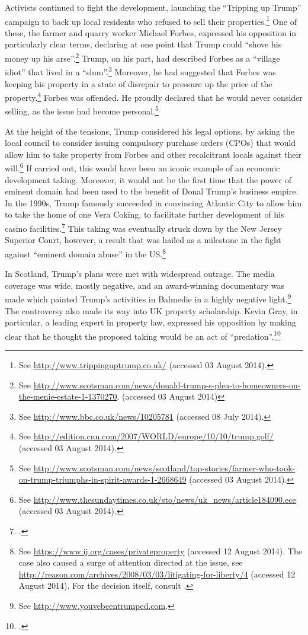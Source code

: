 Activists continued to fight the development, launching the ``Tripping up Trump'' campaign to back up local residents who refused to sell their properties.\footnote{See \url{http://www.trippinguptrump.co.uk/} (accessed 03 August 2014).} One of these, the farmer and quarry worker Michael Forbes, expressed his opposition in particularly clear terms, declaring at one point that Trump could ``shove his money up his arse''.\footnote{See \url{http://www.scotsman.com/news/donald-trump-s-plea-to-homeowners-on-the-menie-estate-1-1370270}. (accessed 03 August 2014)} Trump, on his part, had described Forbes as a ``village idiot'' that lived in a ``slum''.\footnote{See \url{http://www.bbc.co.uk/news/10205781} (accessed 08 July 2014).} Moreover, he had suggested that Forbes was keeping his property in a state of disrepair to pressure up the price of the property.\footnote{See \url{http://edition.cnn.com/2007/WORLD/europe/10/10/trump.golf/} (accessed 03 August 2014).} Forbes was offended. He proudly declared that he would never consider selling, as the issue had become personal.\footnote{See \url{http://www.scotsman.com/news/scotland/top-stories/farmer-who-took-on-trump-triumphs-in-spirit-awards-1-2668649} (accessed 03 August 2014).}

At the height of the tensions, Trump considered his legal options, by asking the local council to consider issuing compulsory purchase orders (CPOs) that would allow him to take property from Forbes and other recalcitrant locals against their will.\footnote{See \url{http://www.thesundaytimes.co.uk/sto/news/uk_news/article184090.ece} (accessed 03 August 2014).} If carried out, this would have been an iconic example of an economic development taking. Moreover, it would not be the first time that the power of eminent domain had been used to the benefit of Donal Trump's business empire. In the 1990s, Trump famously succeeded in convincing Atlantic City to allow him to take the home of one Vera Coking, to facilitate further development of his casino facilities.\footcite[297-301]{jones00} This taking was eventually struck down by the New Jersey Superior Court, however, a result that was hailed as a milestone in the fight against ``eminent domain abuse'' in the US.\footnote{See \url{https://www.ij.org/cases/privateproperty} (accessed 12 August 2014). The case also caused a surge of attention directed at the issue, see \url{http://reason.com/archives/2008/03/03/litigating-for-liberty/4} (accessed 12 August 2014). For the decision itself, consult \cite{banin98}.}

In Scotland, Trump's plans were met with widespread outrage. The media coverage was wide, mostly negative, and an award-winning documentary was made which painted Trump's activities in Balmedie in a highly negative light.\footnote{See \url{http://www.youvebeentrumped.com}.} The controversy also made its way into UK property scholarship. Kevin Gray, in particular, a leading expert in property law, expressed his opposition by making clear that he thought the proposed taking would be an act of ``predation''.\footcite{gray11}

